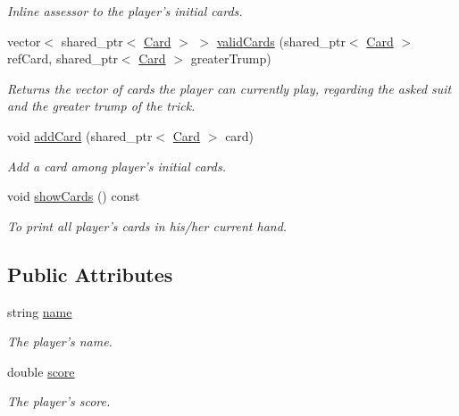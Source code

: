 \begin{DoxyCompactItemize}
\begin{DoxyCompactList}\small\item\em Inline assessor to the player's initial cards. \end{DoxyCompactList}\item 
vector$<$ shared\-\_\-ptr$<$ \hyperlink{classCard}{Card} $>$ $>$ \hyperlink{classPlayer_ab89873d894a8e4e7e67a16feba4bf116}{valid\-Cards} (shared\-\_\-ptr$<$ \hyperlink{classCard}{Card} $>$ ref\-Card, shared\-\_\-ptr$<$ \hyperlink{classCard}{Card} $>$ greater\-Trump)
\begin{DoxyCompactList}\small\item\em Returns the vector of cards the player can currently play, regarding the asked suit and the greater trump of the trick. \end{DoxyCompactList}\item 
void \hyperlink{classPlayer_a7c7b8325247c91ef255ca493de9f35eb}{add\-Card} (shared\-\_\-ptr$<$ \hyperlink{classCard}{Card} $>$ card)
\begin{DoxyCompactList}\small\item\em Add a card among player's initial cards. \end{DoxyCompactList}\item 
\hypertarget{classPlayer_a5216f487067dd79371af457f4b8f1769}{void \hyperlink{classPlayer_a5216f487067dd79371af457f4b8f1769}{show\-Cards} () const }\label{classPlayer_a5216f487067dd79371af457f4b8f1769}

\begin{DoxyCompactList}\small\item\em To print all player's cards in his/her current hand. \end{DoxyCompactList}\end{DoxyCompactItemize}
\subsection*{Public Attributes}
\begin{DoxyCompactItemize}
\item 
\hypertarget{classPlayer_acf0355128a99ee20ad9931b760fb2de1}{string \hyperlink{classPlayer_acf0355128a99ee20ad9931b760fb2de1}{name}}\label{classPlayer_acf0355128a99ee20ad9931b760fb2de1}

\begin{DoxyCompactList}\small\item\em The player's name. \end{DoxyCompactList}\item 
\hypertarget{classPlayer_a55f7b5b674245c2e09f3c191a54d3542}{double \hyperlink{classPlayer_a55f7b5b674245c2e09f3c191a54d3542}{score}}\label{classPlayer_a55f7b5b674245c2e09f3c191a54d3542}

\begin{DoxyCompactList}\small\item\em The player's score. \end{DoxyCompactList}\end{DoxyCompactItemize}
